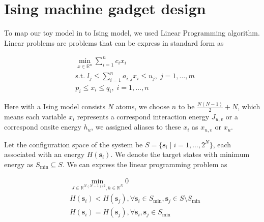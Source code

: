 \documentclass[twocolumn,superscriptaddress,english,showpacs,longbibliography]{revtex4-2}
\begin{document}

\begin{acknowledgments}
\end{acknowledgments}

%


\appendix

\section{Ising machine gadget design}\label{sec:gadget-design}
To map our toy model in  to
Ising model, we used Linear Programming algorithm.
Linear problems are problems that can be express in standard form as

\begin{equation}
    \begin{split}
        &\min_{x \in \mathbb{R}^n} \sum_{i=1}^n c_ix_i\\
        &\text{s.t. } l_j \leq \sum_{i=1}^n a_{i,j}x_i \leq u_j, \; j=1,\ldots,m\\
        &p_i \leq x_i \leq q_i, \; i=1,\ldots, n
    \end{split}
\end{equation}

Here with a Ising model consists $N$ atoms, we choose $n$ to be $\frac{N(N-1)}{2} + N$, which means each variable $x_i$ represents a correspond interaction energy $J_{u, v}$ or a correspond onsite energy $h_u$, we assigned aliases to these $x_i$ as $x_{u,v}$ or $x_{u}$.

Let the configuration space of the system be $S = \{\mathbf s_i\mid i=1,\ldots, 2^N\}$, each associated with an energy $H(\mathbf s_i)$. We denote the target states with minimum energy as $S_{\text{min}} \subseteq S$. We can express the linear programming problem as

\begin{equation}
    \begin{split}
        &\min_{J \in \mathbb{R}^{N(N{-}1)/2}, h\in \mathbb{R}^N} 0\\
        &H(\mathbf s_i) < H(\mathbf s_j), \forall \mathbf s_i \in S_{\text{min}}, \mathbf s_j \in S \setminus S_{\text{min}}\\
        &H(\mathbf s_i) = H(\mathbf s_j), \forall \mathbf s_i, \mathbf s_j \in S_{\text{min}}
    \end{split}
\end{equation}
\end{document}
